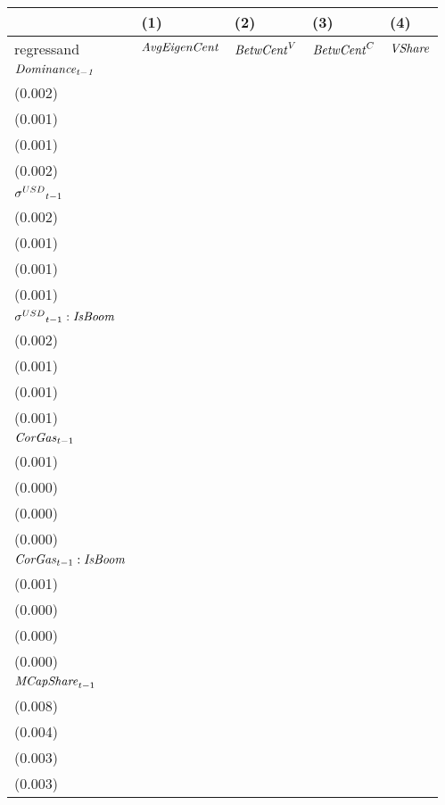 \begin{tabular}{lllll}
\toprule
{} &                                   (1) &                                   (2) &                                   (3) &                                   (4) \\
\midrule
regressand                                  &                  ${\it AvgEigenCent}$ &                    ${\it BetwCent}^V$ &                    ${\it BetwCent}^C$ &                        ${\it VShare}$ \\
$\it Dominance_{t-1}$                       &   \makecell{$0.830^{***}$ \\ (0.002)} &   \makecell{$0.949^{***}$ \\ (0.001)} &   \makecell{$0.950^{***}$ \\ (0.001)} &   \makecell{$0.880^{***}$ \\ (0.002)} \\
${{\it \sigma}^{USD}}_{t-1}$                &     \makecell{$-0.001^{}$ \\ (0.002)} &     \makecell{$-0.000^{}$ \\ (0.001)} &     \makecell{$-0.000^{}$ \\ (0.001)} &     \makecell{$-0.000^{}$ \\ (0.001)} \\
${{\it \sigma}^{USD}}_{t-1} : {\it IsBoom}$ &   \makecell{$0.016^{***}$ \\ (0.002)} &      \makecell{$0.000^{}$ \\ (0.001)} &      \makecell{$0.000^{}$ \\ (0.001)} &   \makecell{$0.002^{***}$ \\ (0.001)} \\
${{\it CorGas}}_{t-1}$                      &      \makecell{$0.000^{}$ \\ (0.001)} &     \makecell{$-0.000^{}$ \\ (0.000)} &      \makecell{$0.000^{}$ \\ (0.000)} &      \makecell{$0.000^{}$ \\ (0.000)} \\
${{\it CorGas}}_{t-1} : {\it IsBoom}$       &     \makecell{$-0.001^{}$ \\ (0.001)} &     \makecell{$-0.000^{}$ \\ (0.000)} &     \makecell{$-0.000^{}$ \\ (0.000)} &     \makecell{$-0.000^{}$ \\ (0.000)} \\
${{\it MCapShare}}_{t-1}$                   &      \makecell{$0.003^{}$ \\ (0.008)} &   \makecell{$0.037^{***}$ \\ (0.004)} &   \makecell{$0.039^{***}$ \\ (0.003)} &   \makecell{$0.032^{***}$ \\ (0.003)} \\

\end{tabular}
